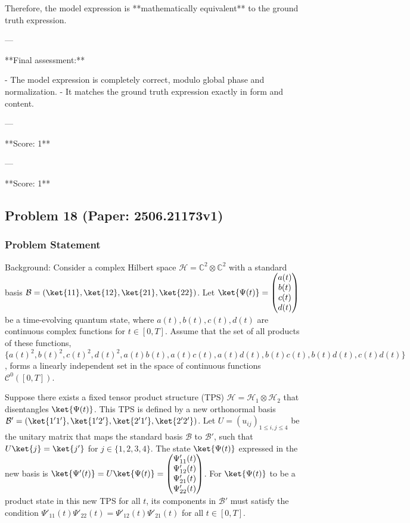 \documentclass[10pt]{article}
\begin{document}
Therefore, the model expression is **mathematically equivalent** to the ground truth expression.

---

**Final assessment:**

- The model expression is completely correct, modulo global phase and normalization.
- It matches the ground truth expression exactly in form and content.

---

**Score: 1**

---

**Score: 1**

\newpage
\subsection*{Problem 18 (Paper: 2506.21173v1)}
\subsubsection*{Problem Statement}
Background:
Consider a complex Hilbert space $\mathcal{H} = \mathbb{C}^2 \otimes \mathbb{C}^2$ with a standard basis $\mathcal{B} = (\ket{11}, \ket{12}, \ket{21}, \ket{22})$. Let $\ket{\Psi(t)} = \begin{pmatrix} a(t) \\ b(t) \\ c(t) \\ d(t) \end{pmatrix}$ be a time-evolving quantum state, where $a(t), b(t), c(t), d(t)$ are continuous complex functions for $t \in [0,T]$. Assume that the set of all products of these functions, $\{a(t)^2, b(t)^2, c(t)^2, d(t)^2, a(t)b(t), a(t)c(t), a(t)d(t), b(t)c(t), b(t)d(t), c(t)d(t)\}$, forms a linearly independent set in the space of continuous functions $\mathcal{C}^0([0,T])$.

Suppose there exists a fixed tensor product structure (TPS) $\mathcal{H} = \mathcal{H}_1 \otimes \mathcal{H}_2$ that disentangles $\ket{\Psi(t)}$. This TPS is defined by a new orthonormal basis $\mathcal{B}' = (\ket{1'1'}, \ket{1'2'}, \ket{2'1'}, \ket{2'2'})$. Let $U = (u_{ij})_{1 \leq i,j \leq 4}$ be the unitary matrix that maps the standard basis $\mathcal{B}$ to $\mathcal{B}'$, such that $U \ket{j} = \ket{j'}$ for $j \in \{1,2,3,4\}$. The state $\ket{\Psi(t)}$ expressed in the new basis is $\ket{\Psi'(t)} = U \ket{\Psi(t)} = \begin{pmatrix} \Psi'_{11}(t) \\ \Psi'_{12}(t) \\ \Psi'_{21}(t) \\ \Psi'_{22}(t) \end{pmatrix}$. For $\ket{\Psi(t)}$ to be a product state in this new TPS for all $t$, its components in $\mathcal{B}'$ must satisfy the condition $\Psi'_{11}(t) \Psi'_{22}(t) = \Psi'_{12}(t) \Psi'_{21}(t)$ for all $t \in [0,T]$.
\end{document}
